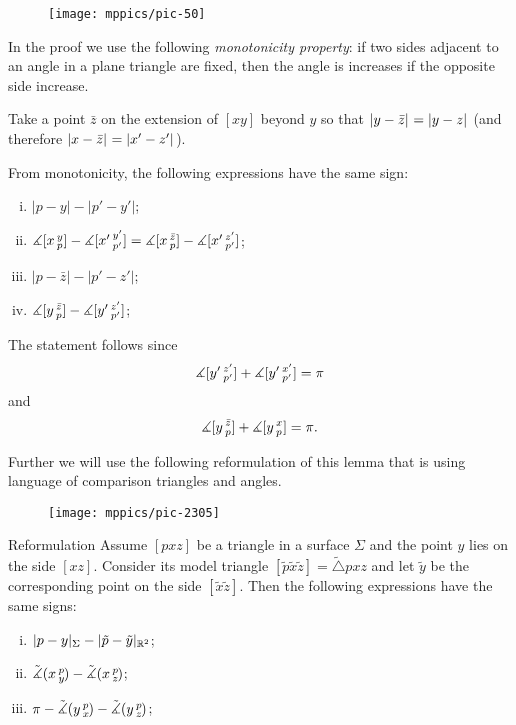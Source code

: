 \begin{figure}[h!]
\vskip-0mm
\centering
\texttt{[image: mppics/pic-50]}
\vskip-0mm
\end{figure}

In the proof we use the following \emph{monotonicity property}:
if two sides adjacent to an angle in a plane triangle are fixed, 
then the angle is increases if the opposite side increase.

Take 
a point $\bar z$ on the extension of 
$[xy]$ beyond $y$ so that $\dist{y}{\bar z}{}=\dist{y}{z}{}$ (and therefore $\dist{x}{\bar z}{}=\dist{x'}{z'}{}$). 
 
From monotonicity, 
the following expressions have the same sign:
\begin{enumerate}[(i)]
\item $|p-y|-|p'-y'|$;
\item $\measuredangle[x\,{}^{y}_{p}]-\measuredangle[x'\,{}^{y'}_{p'}]=\measuredangle[x\,{}^{\bar z}_{p}]-\measuredangle[x'\,{}^{z'}_{p'}]$;
\item $|p-\bar z|-|p'-z'|$;
\item $\measuredangle[y\,{}^{\bar z}_{p}]-\measuredangle[y'\,{}^{z'}_{p'}]$;
\end{enumerate}
The statement follows since
\[\measuredangle[y'\,{}^{z'}_{p'}]+\measuredangle[y'\,{}^{x'}_{p'}]=\pi\]
and
\[\measuredangle[y\,{}^{\bar z}_{p}]+\measuredangle[y\,{}^{x}_{p}]=\pi.\]
\qedsf

Further we will use the following reformulation of this lemma that is using language of comparison triangles and angles.

\begin{wrapfigure}{r}{25mm}
\vskip-0mm
\centering
\texttt{[image: mppics/pic-2305]}
\end{wrapfigure}

\begin{thm}{Reformulation}\label{lem:alex-reformulation}
\label{lem:alex}
Assume $[pxz]$ be a triangle in a surface $\Sigma$ and 
the point $y$ lies on the side $[xz]$.
Consider its model triangle $[\tilde p\tilde x\tilde z]=\tilde \triangle pxz$ and let $\tilde y$ be the corresponding point on the side $[\tilde x\tilde z]$.
Then the following expressions have the same signs:
\begin{enumerate}[(i)]
 \item $|p-y|_\Sigma-|\tilde p-\tilde y|_{\mathbb{R}^2}$;
 \item $\tilde\measuredangle(x\,{}^{p}_{y}\hspace{-0.2ex})-\tilde\measuredangle(x\,{}^{p}_{z}\hspace{-0.2ex})$;
 \item $\pi-\tilde\measuredangle(y\,{}^{p}_{x}\hspace{-0.2ex})-\tilde\measuredangle(y\,{}^{p}_{z}\hspace{-0.2ex})$;
\end{enumerate}
\end{thm}

